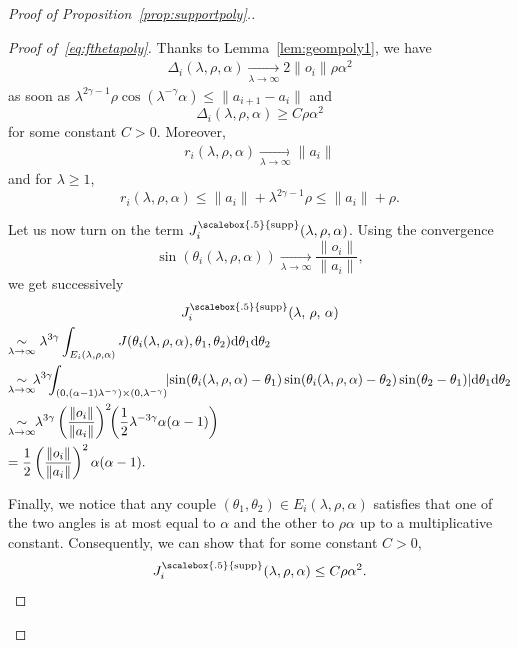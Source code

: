 \documentclass[10pt]{amsart}
\theoremstyle{definition}\newtheorem{defi}[theo]{Definition}\newtheorem{rema}[theo]{Remark}\newtheorem{exam}[theo]{Example}\newtheorem{exem}[theo]{Example}\newtheorem{nota}[theo]{Notation}
\newcommand{\dd}{\mathrm{d}}
\DeclareMathOperator{\supp}{\scalebox{.5}{supp}}
\newcommand{\pass}{\vspace{0.3cm}\noindent}
\newcommand{\noi}{\noindent}
\newenvironment*{prooff}{\begin{proof}}{\let\qed\relax\end{proof}}
\begin{document}
\begin{proof}[{Proof of Proposition~\ref{prop:supportpoly}.}]
\begin{prooff}[{Proof of~\eqref{eq:fthetapoly}}]
Thanks to Lemma~\ref{lem:geompoly1}, we have
\begin{align*}
\Delta_i(\lambda,\rho,\alpha) \underset{\lambda\to\infty}{\longrightarrow} 2\|o_i\|\rho\alpha^2
\end{align*}
as soon as $\lambda^{2\gamma-1}\rho\cos(\lambda^{-\gamma}\alpha)\le \|a_{i+1}-a_i\|$ and
\begin{equation}\label{eq:dominDeltapolyg}
\Delta_i(\lambda,\rho,\alpha)\ge C \rho \alpha^2
\end{equation}
for some constant $C>0$. Moreover,
\begin{align*}
r_i(\lambda,\rho,\alpha) \underset{\lambda\to\infty}{\longrightarrow} \|a_i\|
\end{align*}
and for $\lambda\ge 1$,
\begin{equation}\label{eq:dominripolyg}
r_i(\lambda,\rho,\alpha)\le \|a_i\|+\lambda^{2\gamma-1}\rho\le \|a_i\|+\rho.
\end{equation}

Let us now turn on the term $J^{\supp}_i(\lambda,\rho,\alpha)$. Using the convergence
\[
\sin(\theta_i(\lambda,\rho,\alpha))\underset{\lambda\to\infty}{\longrightarrow} \frac{\|o_i\|}{\|a_i\|},
\]
we get successively
\begin{multline*}
J^{\supp}_i(\lambda,\,\rho,\,\alpha) \\
\begin{aligned}
& \!\!\underset{\lambda\to\infty}{\sim} \lambda^{3\gamma}\int_{E_i(\lambda,\rho,\alpha)}J(\theta_i(\lambda,\rho,\alpha),\theta_1,\theta_2)\dd \theta_1\dd \theta_2 \\
&\!\! \underset{\lambda\to\infty}{\sim}\!\!\!\lambda^{3\gamma}\!\!\!\int_{\left(0,(\alpha-1)\lambda^{-\gamma}\right)\times(0,\lambda^{-\gamma})}\!\!\left|\sin(\theta_i(\lambda,\rho,\alpha)-\theta_1)\sin(\theta_i(\lambda,\rho,\alpha)-\theta_2)\sin(\theta_2-\theta_1)\right|\!\dd \theta_1\dd \theta_2 \\
&\!\! \underset{\lambda\to\infty}{\sim}\!\!\lambda^{3\gamma}\left(\frac{\|o_i\|}{\|a_i\|}\right)^2 \!\!\left(\frac1{2}\lambda^{-3\gamma}\alpha(\alpha-1)\right) \\
&\!\! = \frac1{2}\left(\frac{\|o_i\|}{\|a_i\|}\right)^2\alpha(\alpha-1).
\end{aligned}
\end{multline*}

Finally, we notice that any couple $(\theta_1,\theta_2)\in E_i(\lambda,\rho,\alpha)$ satisfies that one of the two angles is at most equal to $\alpha$ and the other to $\rho\alpha$ up to a multiplicative constant. Consequently, we can show that for some constant $C>0$,
\begin{equation}\label{eq:dominJpolyg}
J^{\supp}_i(\lambda,\rho,\alpha)\le C\rho\alpha^2.
\end{equation}


\end{prooff}
\end{proof}
\end{document}

